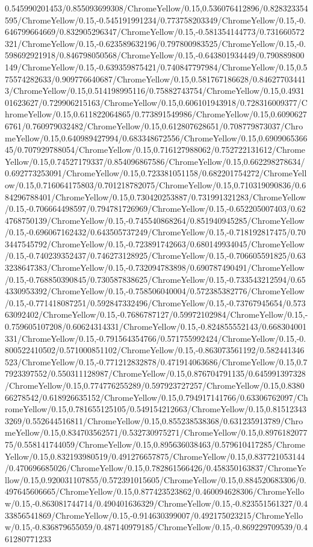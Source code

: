 {\begin{tikzternal}
{0.545990201453/0.855093699308/ChromeYellow/0.15,0.536076412896/0.828323354595/ChromeYellow/0.15,-0.545191991234/0.773758203349/ChromeYellow/0.15,-0.646799664669/0.832905296347/ChromeYellow/0.15,-0.581354144773/0.731660572321/ChromeYellow/0.15,-0.623589632196/0.797800983525/ChromeYellow/0.15,-0.598692921918/0.846798050568/ChromeYellow/0.15,-0.643801934449/0.790889800149/ChromeYellow/0.15,-0.639359875421/0.740847797984/ChromeYellow/0.15,0.575574282633/0.909776640687/ChromeYellow/0.15,0.581767186628/0.846277034413/ChromeYellow/0.15,0.514198995116/0.75882743754/ChromeYellow/0.15,0.493101623627/0.729906215163/ChromeYellow/0.15,0.606101943918/0.728316009377/ChromeYellow/0.15,0.611822064865/0.773891549986/ChromeYellow/0.15,0.60906276761/0.760979032482/ChromeYellow/0.15,0.612807628651/0.708779873037/ChromeYellow/0.15,0.640989427994/0.683348672556/ChromeYellow/0.15,0.690906536645/0.707929788054/ChromeYellow/0.15,0.716127988062/0.752722131612/ChromeYellow/0.15,0.74527179337/0.854096867586/ChromeYellow/0.15,0.662298278634/0.692773253091/ChromeYellow/0.15,0.723381051158/0.682201754272/ChromeYellow/0.15,0.716064175803/0.701218782075/ChromeYellow/0.15,0.710319090836/0.684296788401/ChromeYellow/0.15,0.730420253887/0.731991321283/ChromeYellow/0.15,-0.706664498597/0.794781726969/ChromeYellow/0.15,-0.652205007403/0.624768750139/ChromeYellow/0.15,-0.745540868264/0.851940945285/ChromeYellow/0.15,-0.696067162432/0.643505737249/ChromeYellow/0.15,-0.718192817475/0.703447545792/ChromeYellow/0.15,-0.723891742663/0.680149934045/ChromeYellow/0.15,-0.740239352437/0.746273128925/ChromeYellow/0.15,-0.706605591825/0.633238647383/ChromeYellow/0.15,-0.732094783898/0.690787490491/ChromeYellow/0.15,-0.768850390845/0.730587838625/ChromeYellow/0.15,-0.733543212594/0.654330953392/ChromeYellow/0.15,-0.758506040004/0.572385382776/ChromeYellow/0.15,-0.771418087251/0.592847332496/ChromeYellow/0.15,-0.73767945654/0.57363092402/ChromeYellow/0.15,-0.7686787127/0.59972102984/ChromeYellow/0.15,-0.759605107208/0.60624314331/ChromeYellow/0.15,-0.824855552143/0.668304001331/ChromeYellow/0.15,-0.791564354766/0.571755992424/ChromeYellow/0.15,-0.800522410502/0.571000851102/ChromeYellow/0.15,-0.863073561192/0.582441346523/ChromeYellow/0.15,-0.771212832878/0.471914063686/ChromeYellow/0.15,0.77923397552/0.550311128987/ChromeYellow/0.15,0.876704791135/0.645991397328/ChromeYellow/0.15,0.774776255289/0.597923727257/ChromeYellow/0.15,0.838066278542/0.618926635152/ChromeYellow/0.15,0.794917141766/0.63306762097/ChromeYellow/0.15,0.781655125105/0.549154212663/ChromeYellow/0.15,0.815123433269/0.552644516811/ChromeYellow/0.15,0.855238538368/0.631235913789/ChromeYellow/0.15,0.834703562571/0.532730975271/ChromeYellow/0.15,0.897618207775/0.558141744059/ChromeYellow/0.15,0.895636038463/0.579610417285/ChromeYellow/0.15,0.832193980519/0.491276657875/ChromeYellow/0.15,0.837721053144/0.470696685026/ChromeYellow/0.15,0.782861566426/0.458350163837/ChromeYellow/0.15,0.920031107855/0.572391015605/ChromeYellow/0.15,0.884520683306/0.497645606665/ChromeYellow/0.15,0.877423523862/0.460094628306/ChromeYellow/0.15,-0.863081744714/0.490401636329/ChromeYellow/0.15,-0.823551561327/0.433856541869/ChromeYellow/0.15,-0.914630399007/0.492175023215/ChromeYellow/0.15,-0.836879655059/0.487140979185/ChromeYellow/0.15,-0.869229709539/0.461280771233}
\end{tikzternal}}
